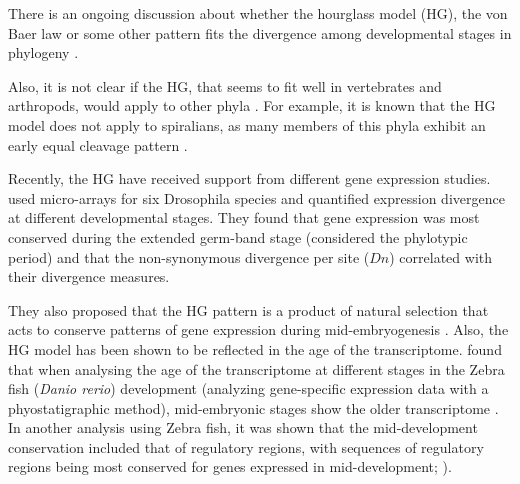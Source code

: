 There is an ongoing discussion about whether the hourglass model (HG), the von Baer law
or some other pattern fits the divergence among developmental stages in phylogeny \citep{Richardson1997,Poe2004,Kalinka2012}.

Also, it is not clear if the HG, that seems to fit well in vertebrates and arthropods, would apply to other phyla \citep{Raff1996} \citep{Salazar-Ciudad2010}. For example, it is known that the HG model does not apply to spiralians, as many members of this phyla exhibit an early equal cleavage pattern \citep{Henry2002}.

Recently, the HG have received support from different gene expression studies.
\citet{Kalinka2010} used micro-arrays for six Drosophila species and quantified expression divergence at different developmental stages. They found that gene expression was most conserved during the extended germ-band stage (considered the phylotypic period) and that the non-synonymous divergence per site ($Dn$) correlated with their divergence measures.

They also proposed that the HG pattern is a product of natural selection that acts to conserve patterns of gene expression during mid-embryogenesis \citep{Kalinka2010}.
%
Also, the HG model has been shown to be reflected in the age of the transcriptome. \citet{Domazet-Loso2010} found that when analysing the age of the transcriptome at different stages in the Zebra fish (\textit{Danio rerio}) development (analyzing gene-specific expression data with a phyostatigraphic method), mid-embryonic stages show the older transcriptome \citep{Domazet-Loso2010}.
In another analysis using Zebra fish, it was shown that the mid-development conservation included that of regulatory regions, with sequences of regulatory regions being most conserved for genes expressed in mid-development; \citealp{Piasecka2013}).

